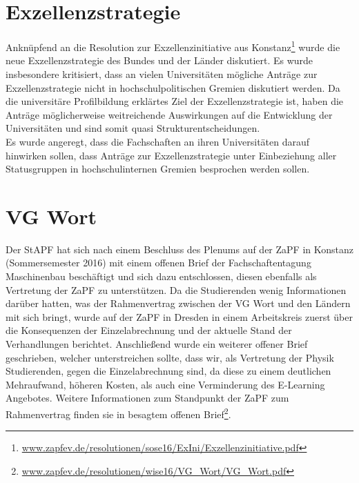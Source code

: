 \section*{Exzellenzstrategie}
Anknüpfend an die Resolution zur Exzellenzinitiative aus Konstanz\footnote{\href{https://zapfev.de/resolutionen/sose16/ExIni/Exzellenzinitiative.pdf}{\url{www.zapfev.de/resolutionen/sose16/ExIni/Exzellenzinitiative.pdf}}} 
wurde die neue Exzellenzstrategie des Bundes und der Länder diskutiert. Es wurde insbesondere kritisiert, dass an vielen Universitäten mögliche Anträge zur 
Exzellenzstrategie nicht in hochschulpolitischen Gremien diskutiert werden. Da die universitäre Profilbildung erklärtes Ziel der Exzellenzstrategie ist, 
haben die Anträge möglicherweise weitreichende Auswirkungen auf die Entwicklung der Universitäten und sind somit quasi Strukturentscheidungen.\\
Es wurde angeregt, dass die Fachschaften an ihren Universitäten darauf hinwirken sollen, dass Anträge zur Exzellenzstrategie unter Einbeziehung 
aller Statusgruppen in hochschulinternen Gremien besprochen werden sollen.

\section*{VG Wort}
Der StAPF hat sich nach einem Beschluss des Plenums auf der ZaPF in Konstanz (Sommersemester 2016) mit einem offenen Brief der Fachschaftentagung Maschinenbau beschäftigt und sich dazu entschlossen, 
diesen ebenfalls als Vertretung der ZaPF zu unterstützen. Da die Studierenden wenig Informationen darüber hatten, was der Rahmenvertrag zwischen der VG Wort und den 
Ländern mit sich bringt, wurde auf der ZaPF in Dresden in einem Arbeitskreis zuerst über die Konsequenzen der Einzelabrechnung und der aktuelle Stand der Verhandlungen 
berichtet. Anschließend wurde ein weiterer offener Brief geschrieben, welcher unterstreichen sollte, dass wir, als Vertretung der Physik Studierenden, gegen die 
Einzelabrechnung sind, da diese zu einem deutlichen Mehraufwand, höheren Kosten, als auch eine Verminderung des E-Learning Angebotes. Weitere Informationen zum 
Standpunkt der ZaPF zum Rahmenvertrag finden sie in besagtem offenen 
Brief\footnote{\href{https://zapfev.de/resolutionen/wise16/VG_Wort/VG_Wort.pdf}{\url{www.zapfev.de/resolutionen/wise16/VG_Wort/VG_Wort.pdf}}}. 

